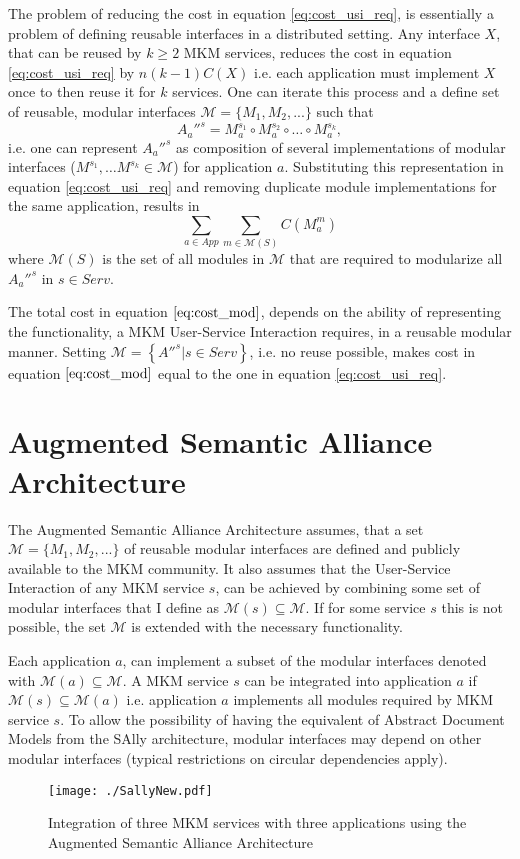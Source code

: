 \documentclass{llncs}
\begin{document}
The problem of reducing the cost in equation \ref{eq:cost_usi_req}, is essentially a problem of defining reusable interfaces in a distributed setting. Any interface $X$, that can be reused by $k \geq 2$ MKM services, reduces the cost in equation \ref{eq:cost_usi_req} by $n\left(k-1\right)C(X)$ i.e. each application must implement $X$ once to then reuse it for $k$ services. One can iterate this process and a define set of reusable, modular interfaces $\mathcal{M} = \{M_1, M_2, ...\}$ such that 
\begin{equation}
A_a''^s = M_a^{s_1} \circ M_a^{s_2} \circ \ldots \circ M_a^{s_k},
\end{equation}
i.e. one can represent $A_a''^s$ as composition of several implementations of 
modular interfaces ($M^{s_1}, \ldots M^{s_k} \in \mathcal{M}$) for application $a$. Substituting this representation in equation \ref{eq:cost_usi_req} and removing duplicate module implementations for the same application, results in
\begin{equation}
 \sum_{a\in App} \sum_{m \in \mathcal{M}(S)} C(M_a^m)
 \label{eq:cost_mod}
\end{equation}
where $\mathcal{M}(S)$ is the set of all modules in $\mathcal{M}$ that are required to modularize all $A_a''^s$ in $s\in Serv$. 

The total cost in equation $\ref{eq:cost_mod}$, depends on the ability of representing the functionality, a MKM User-Service Interaction requires, in a reusable modular manner. Setting $\mathcal{M} = \left\{A''^s | s \in Serv \right\}$, i.e. no reuse possible, makes cost in equation $\ref{eq:cost_mod}$ equal to the one in equation \ref{eq:cost_usi_req}.

\section{Augmented Semantic Alliance Architecture}
\label{ammend-arch}
The Augmented Semantic Alliance Architecture assumes, that a set $\mathcal{M} = \{M_1, M_2, ...\}$  of reusable modular interfaces are defined and publicly available to the MKM community. It also assumes that the User-Service Interaction of any MKM service $s$, can be achieved by combining some set of modular interfaces that I define as $\mathcal{M}(s) \subseteq \mathcal{M}$. If for some service $s$ this is not possible, the set $\mathcal{M}$ is extended with the necessary functionality.

Each application $a$, can implement a subset of the modular interfaces denoted with $\mathcal{M}(a) \subseteq \mathcal{M}$. A MKM service $s$ can be integrated into application $a$ if $\mathcal{M}(s) \subseteq \mathcal{M}(a)$ i.e. application $a$ implements all modules required by MKM service $s$. To allow the possibility of having the equivalent of Abstract Document Models from the SAlly architecture, modular interfaces may depend on other modular interfaces (typical restrictions on circular dependencies apply). 
\begin{figure}
\centering
\texttt{[image: ./SallyNew.pdf]}
\caption{Integration of three MKM services with three applications using the Augmented Semantic Alliance Architecture}
\label{fig:new_sally}
\end{figure}
\end{document}
